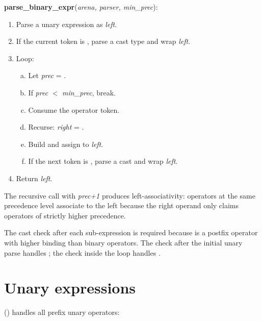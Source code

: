 \begin{algorithm}
\textbf{parse\_binary\_expr}(\textit{arena, parser, min\_prec}):
\begin{enumerate}
\item Parse a unary expression as \textit{left}.
\item If the current token is , parse a cast type and wrap \textit{left}.
\item Loop:
  \begin{enumerate}[(a)]
  \item Let \textit{prec} = .
  \item If \textit{prec} $<$ \textit{min\_prec}, break.
  \item Consume the operator token.
  \item Recurse: \textit{right} = .
  \item Build  and assign to \textit{left}.
  \item If the next token is , parse a cast and wrap \textit{left}.
  \end{enumerate}
\item Return \textit{left}.
\end{enumerate}
\end{algorithm}

\pnum
The recursive call with \textit{prec+1} produces left-associativity: operators
at the same precedence level associate to the left because the right operand
only claims operators of strictly higher precedence.

\pnum
The  cast check after each sub-expression is required because 
is a postfix operator with higher binding than binary operators.  The check after
the initial unary parse handles ; the check inside the loop
handles .

\section{Unary expressions}
\label{sec:par-expr-unary}

\pnum
{} () handles all prefix
unary operators:

